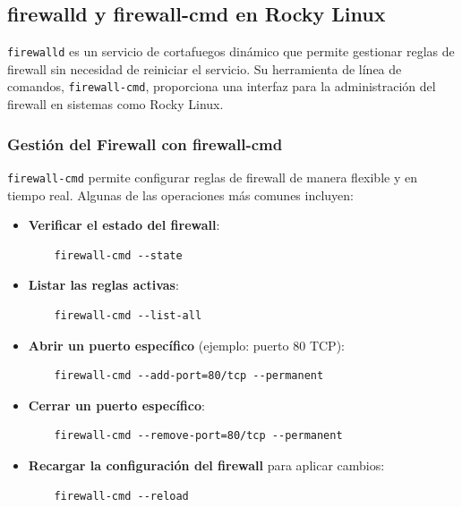 \subsection{firewalld y firewall-cmd en Rocky Linux}

\texttt{firewalld} es un servicio de cortafuegos dinámico que permite gestionar reglas de firewall sin necesidad de reiniciar el servicio. Su herramienta de línea de comandos, \texttt{firewall-cmd}, proporciona una interfaz para la administración del firewall en sistemas como Rocky Linux.

\subsubsection{Gestión del Firewall con firewall-cmd}

\texttt{firewall-cmd} permite configurar reglas de firewall de manera flexible y en tiempo real. Algunas de las operaciones más comunes incluyen:

\begin{itemize}
    \item \textbf{Verificar el estado del firewall}:
    \begin{verbatim}
    firewall-cmd --state
    \end{verbatim}

    \item \textbf{Listar las reglas activas}:
    \begin{verbatim}
    firewall-cmd --list-all
    \end{verbatim}

    \item \textbf{Abrir un puerto específico} (ejemplo: puerto 80 TCP):
    \begin{verbatim}
    firewall-cmd --add-port=80/tcp --permanent
    \end{verbatim}
    
    \item \textbf{Cerrar un puerto específico}:
    \begin{verbatim}
    firewall-cmd --remove-port=80/tcp --permanent
    \end{verbatim}

    \item \textbf{Recargar la configuración del firewall} para aplicar cambios:
    \begin{verbatim}
    firewall-cmd --reload
    \end{verbatim}
\end{itemize}

